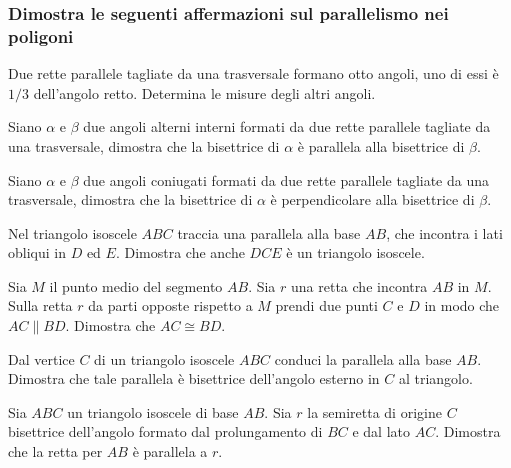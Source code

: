 \subsubsection*{Dimostra le seguenti affermazioni sul parallelismo 
nei poligoni}
\begin{multicols}{2}

\begin{esercizio}
	\label{ese:3.39}
	Due rette parallele tagliate da una trasversale formano otto angoli, 
	uno di essi è $1/3$ dell'angolo retto. Determina le misure degli 
	altri angoli.
\end{esercizio}

\begin{esercizio}
	\label{ese:3.40}
	Siano $\alpha$ e $\beta$ due angoli alterni interni formati da due 
	rette parallele tagliate da una trasversale, dimostra che la 
	bisettrice di $\alpha$ è parallela alla bisettrice di $\beta$.
\end{esercizio}

\begin{esercizio}
	\label{ese:3.41}
	Siano $\alpha$ e $\beta$ due angoli coniugati formati da due rette 
	parallele tagliate da una trasversale, dimostra che la bisettrice di 
	$\alpha$ è perpendicolare alla bisettrice di $\beta$.
\end{esercizio}

\begin{esercizio}
\label{ese:3.24}
Nel triangolo isoscele $ABC$ traccia una parallela alla base $AB$, 
che incontra i lati obliqui in $D$ ed $E$. Dimostra che anche $DCE$ è 
un triangolo isoscele.
\end{esercizio}

\begin{esercizio}
\label{ese:3.26}
Sia $M$ il punto medio del segmento $AB$. Sia $r$ una retta che 
incontra $AB$ in $M$. Sulla retta $r$ da parti opposte rispetto a $M$ 
prendi due punti $C$ e $D$ in modo che $AC\parallel BD$. Dimostra che 
$AC\cong BD$. 
\end{esercizio}

\begin{esercizio}
\label{ese:3.27}
Dal vertice $C$ di un triangolo isoscele $ABC$ conduci la parallela 
alla base $AB$. Dimostra che tale parallela è bisettrice dell'angolo 
esterno in $C$ al triangolo.
\end{esercizio}

\begin{esercizio}
\label{ese:3.28}
Sia $ABC$ un triangolo isoscele di base $AB$. Sia $r$ la semiretta di 
origine $C$ bisettrice dell'angolo formato dal prolungamento di $BC$ 
e dal lato $AC$. Dimostra che la retta per $AB$ è parallela a $r$.
\end{esercizio}


\end{multicols}
